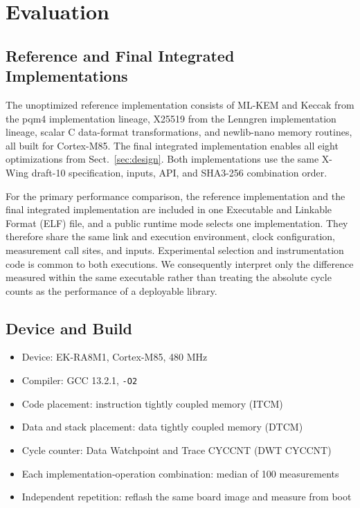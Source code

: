 \documentclass[runningheads,orivec]{llncs}
\newcommand{\xwing}{X-Wing}
\begin{document}
\FloatBarrier
\section{Evaluation}\label{sec:evaluation}

\subsection{Reference and Final Integrated Implementations}

The unoptimized reference implementation consists of ML-KEM and Keccak from the
pqm4 implementation lineage, X25519 from the Lenngren implementation lineage,
scalar C data-format transformations, and newlib-nano memory routines, all built
for Cortex-M85. The final integrated implementation enables all eight
optimizations from Sect.~\ref{sec:design}. Both implementations use the same
\xwing{} draft-10 specification, inputs, API, and SHA3-256 combination order.

For the primary performance comparison, the reference implementation and the
final integrated implementation are included in one Executable and Linkable
Format (ELF) file, and a public runtime mode selects one implementation. They
therefore share the same link and execution environment, clock configuration,
measurement call sites, and inputs. Experimental selection and instrumentation
code is common to both executions. We consequently interpret only the
difference measured within the same executable rather than treating the
absolute cycle counts as the performance of a deployable library.

\subsection{Device and Build}

\begin{itemize}[leftmargin=*,itemsep=1pt]
\item Device: EK-RA8M1, Cortex-M85, 480 MHz
\item Compiler: GCC 13.2.1, \texttt{-O2}
\item Code placement: instruction tightly coupled memory (ITCM)
\item Data and stack placement: data tightly coupled memory (DTCM)
\item Cycle counter: Data Watchpoint and Trace CYCCNT (DWT CYCCNT)
\item Each implementation-operation combination: median of 100 measurements
\item Independent repetition: reflash the same board image and measure from boot
\end{itemize}
\end{document}
